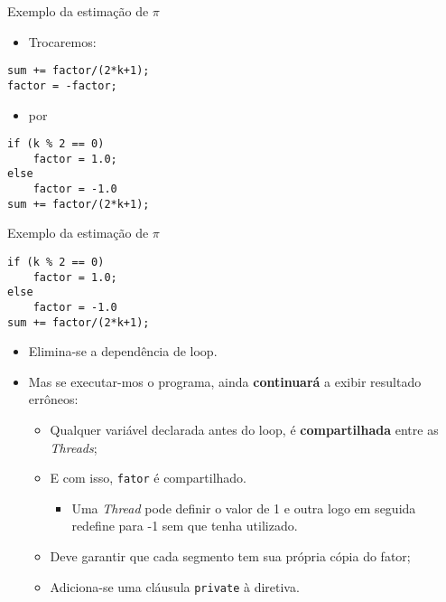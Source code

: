 \begin{frame}[fragile]{Exemplo da estimação de $\pi$}
	\begin{itemize}
		\item Trocaremos:
	\end{itemize}
	\begin{lstlisting}
sum += factor/(2*k+1);
factor = -factor;
	\end{lstlisting}

	\begin{itemize}
		\item por
	\end{itemize}
	\begin{lstlisting}
if (k % 2 == 0)
	factor = 1.0;
else 
	factor = -1.0
sum += factor/(2*k+1);
	\end{lstlisting}
\end{frame}





\begin{frame}[fragile]{Exemplo da estimação de $\pi$}
	\begin{lstlisting}
if (k % 2 == 0)
	factor = 1.0;
else 
	factor = -1.0
sum += factor/(2*k+1);
	\end{lstlisting}

	\begin{itemize}
		\item Elimina-se a dependência de loop.

			\pause

		\item Mas se executar-mos o programa, ainda {\bf continuará} a exibir resultado errôneos:
		\begin{itemize}
			\item Qualquer variável declarada antes do loop, é {\bf compartilhada} entre as \textit{Threads};
			\item E com isso, {\tt fator} é compartilhado. 
			\begin{itemize}
				\item Uma \textit{Thread} pode definir o valor de 1 e outra logo em seguida redefine para -1 sem que tenha utilizado.
			\end{itemize}
			\item Deve garantir que cada segmento tem sua própria cópia do fator;
			\item Adiciona-se uma cláusula {\tt private} à diretiva.
		\end{itemize}
	\end{itemize}
\end{frame}


